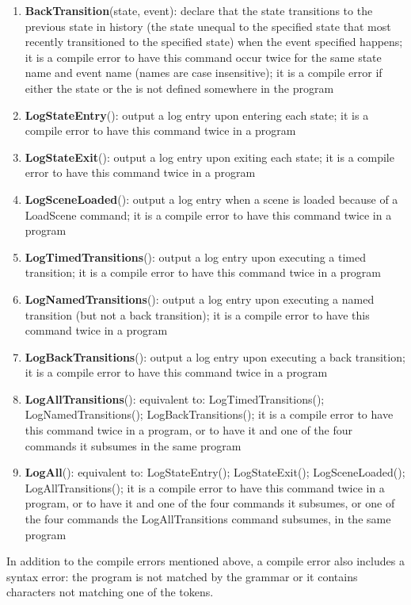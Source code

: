 \documentclass[letter,12pt]{article}
\begin{document}
\begin{enumerate}
\item \textbf{BackTransition}(state, event): declare that the state transitions to the previous state in history (the state unequal to the specified state that most recently transitioned to the specified state) when the event specified happens; it is a compile error to have this command occur twice for the same state name and event name (names are case insensitive); it is a compile error if either the state or the is not defined somewhere in the program
\item \textbf{LogStateEntry}(): output a log entry upon entering each state; it is a compile error to have this command twice in a program
\item \textbf{LogStateExit}(): output a log entry upon exiting each state; it is a compile error to have this command twice in a program
\item \textbf{LogSceneLoaded}(): output a log entry when a scene is loaded because of a LoadScene command; it is a compile error to have this command twice in a program
\item \textbf{LogTimedTransitions}(): output a log entry upon executing a timed transition; it is a compile error to have this command twice in a program
\item \textbf{LogNamedTransitions}(): output a log entry upon executing a named transition (but not a back transition); it is a compile error to have this command twice in a program
\item \textbf{LogBackTransitions}(): output a log entry upon executing a back transition; it is a compile error to have this command twice in a program
\item \textbf{LogAllTransitions}(): equivalent to: LogTimedTransitions(); LogNamedTransitions(); LogBackTransitions(); it is a compile error to have this command twice in a program, or to have it and one of the four commands it subsumes in the same program
\item \textbf{LogAll}(): equivalent to: LogStateEntry(); LogStateExit(); LogSceneLoaded(); LogAllTransitions(); it is a compile error to have this command twice in a program, or to have it and one of the four commands it subsumes, or one of the four commands the LogAllTransitions command subsumes, in the same program

\end{enumerate}

In addition to the compile errors mentioned above, a compile error also includes a syntax error: the program is not matched by the grammar or it contains characters not matching one of the tokens.
\end{document}
